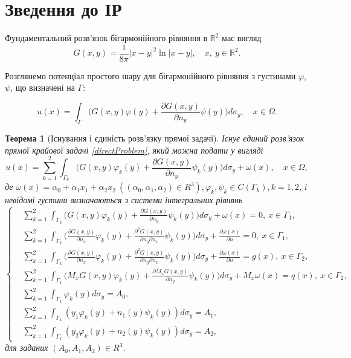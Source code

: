 \documentclass[12pt]{report}
\newtheorem{theorem}{Теорема}
\begin{document}
\section{Зведення до ІР}

Фундаментальний розв'язок бігармонійного рівняння в $\mathbb{R}^2$ має вигляд
 \begin{equation}
 	G(x, y)=\frac{1}{8\pi}|x-y|^2\ln|x-y|, \quad x,\ y \in \mathbb{R}^2.
 \end{equation}

Розглянемо потенціал простого шару для бігармонійного рівняння \cite{chapko} з густинами $\varphi$, $\psi$, що визначені на $\Gamma$:

\begin{equation}
	 	u(x)=\int_{\Gamma}\bigg(G(x,y)\varphi(y)+\frac{\partial G(x,y)}{\partial n_y}\psi(y)\bigg)d\sigma_y, \quad x\in \Omega. \nonumber
\end{equation}

\begin{theorem}[Існування і єдиність розв'язку прямої задачі]
Існує єдиний розв'язок прямої крайової задачі \eqref{directProblem}, який можна подати у вигляді
	 \begin{equation}
	 	u(x)=\sum_{k=1}^{2}\int_{\Gamma_k}\bigg(G(x,y)\varphi_k(y)+\frac{\partial G(x,y)}{\partial n_y}\psi_k(y)\bigg)d\sigma_y+\omega(x), \quad x\in \Omega,
	 \end{equation}
	 де $\omega(x) = \alpha_0+\alpha_1x_1+\alpha_2x_2 \ ((\alpha_0,\alpha_1,\alpha_2)\in R^3), \varphi_k,\psi_k\in C(\Gamma_k), k=1,2$, і невідомі густини визначаються з системи інтегральних рівнянь
	 \begin{equation}
	 \left\{
	 	\begin{split}
		\label{system}
	 		&\sum_{k=1}^{2}\int_{\Gamma_k}\bigg(G(x,y)\varphi_k(y)+\frac{\partial G(x,y)}{\partial n_y}\psi_k(y)\bigg)d\sigma_y+\omega(x)=0, \ x\in\Gamma_1, \\
			&\sum_{k=1}^{2}\int_{\Gamma_k}\bigg(\frac{\partial G(x,y)}{\partial n_x}\varphi_k(y)+\frac{\partial^2 G(x,y)}{\partial n_y\partial n_x}\psi_k(y)\bigg)d\sigma_y+\frac{\partial\omega(x)}{\partial n}=0, \ x\in\Gamma_1, \\
			&\sum_{k=1}^{2}\int_{\Gamma_k}\bigg(\frac{\partial G(x,y)}{\partial n_x}\varphi_k(y)+\frac{\partial^2 G(x,y)}{\partial n_y\partial n_x}\psi_k(y)\bigg)d\sigma_y+\frac{\partial\omega(x)}{\partial n}=g(x), \ x\in\Gamma_2, \\
			&\sum_{k=1}^{2}\int_{\Gamma_k}\bigg(M_x G(x,y)\varphi_k(y)+\frac{\partial M_x G(x,y)}{\partial n_y}\psi_k(y)\bigg)d\sigma_y+M_x\omega(x)=q(x), \ x\in\Gamma_2, \\
			&\sum_{k=1}^{2}\int_{\Gamma_k}\varphi_k(y)d\sigma_y=A_0, \\
			&\sum_{k=1}^{2}\int_{\Gamma_k}(y_1\varphi_k(y)+n_1(y)\psi_k(y))d\sigma_y=A_1, \\
			&\sum_{k=1}^{2}\int_{\Gamma_k}(y_2\varphi_k(y)+n_2(y)\psi_k(y))d\sigma_y=A_2,
		\end{split}
	\right.
	 \end{equation}
	для заданих $(A_0,A_1,A_2)\in R^3$.
 \end{theorem}
 
\end{document}
